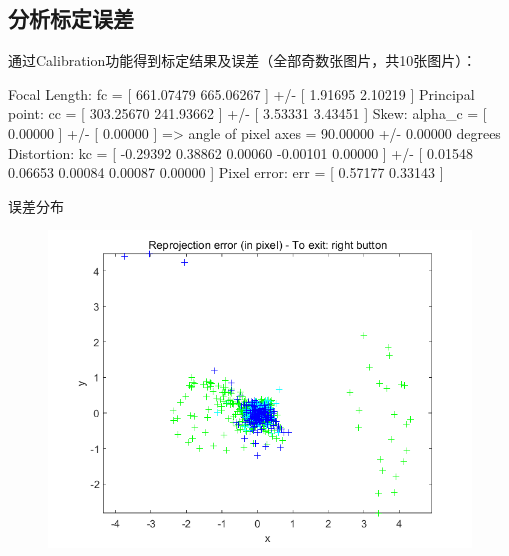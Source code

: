 \documentclass[12pt, a4paper, oneside]{ctexart}
\numberwithin{equation}{section}  %
\begin{document}
\subsection{分析标定误差}
通过Calibration功能得到标定结果及误差（全部奇数张图片，共10张图片）：
\begin{matlabcode}
Focal Length: fc = [ 661.07479   665.06267 ] +/- [ 1.91695   2.10219 ]
Principal point: cc = [ 303.25670   241.93662 ] +/- [ 3.53331   3.43451 ]
Skew: alpha_c = [ 0.00000 ] +/- [ 0.00000  ]   => angle of pixel axes = 90.00000 +/- 0.00000 degrees
Distortion: kc = [ -0.29392   0.38862   0.00060   -0.00101  0.00000 ] +/- [ 0.01548   0.06653   0.00084   0.00087  0.00000 ]
Pixel error: err = [ 0.57177   0.33143 ]
\end{matlabcode}
误差分布
\begin{figure}[htbp]
    \centering
    \includegraphics[scale=0.6]{error.png}
\end{figure}
\end{document}
